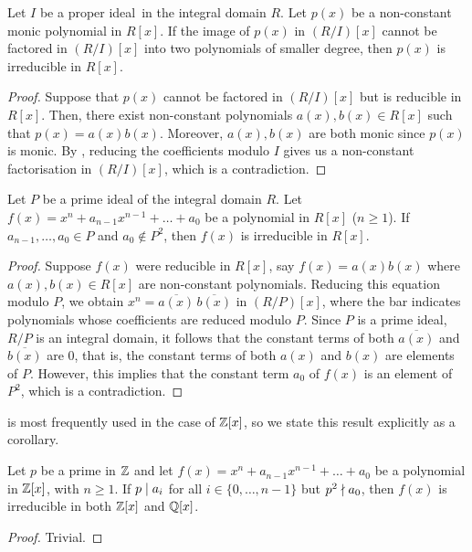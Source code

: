 \begin{prop}
    Let $I$ be a proper ideal\footnotemark\ in the integral domain $R$. Let $p(x)$ be a non-constant monic polynomial in $R[x]$. If the image of $p(x)$ in $(R/I)[x]$ cannot be factored in $(R/I)[x]$ into two polynomials of smaller degree, then $p(x)$ is irreducible in $R[x]$.
\end{prop}
\begin{proof}
    Suppose that $p(x)$ cannot be factored in $(R/I)[x]$ but is reducible in $R[x]$. Then, there exist non-constant polynomials $a(x), b(x) \in R[x]$ such that $p(x) = a(x) b(x)$. Moreover, $a(x), b(x)$ are both monic since $p(x)$ is monic. By , reducing the coefficients modulo $I$ gives us a non-constant factorisation in $(R/I)[x]$, which is a contradiction.
\end{proof}

\begin{prop} \label{prop:ES-criterion}
    Let $P$ be a prime ideal of the integral domain $R$. Let $f(x) = x^n + a_{n-1} x^{n-1} + \ldots + a_0$ be a polynomial in $R[x]$ ($n \geq 1$). If $a_{n-1}, \ldots, a_0 \in P$ and $a_0 \notin P^2$, then $f(x)$ is irreducible in $R[x]$.
\end{prop}
\begin{proof}
    Suppose $f(x)$ were reducible in $R[x]$, say $f(x) = a(x) b(x)$ where $a(x), b(x) \in R[x]$ are non-constant polynomials. Reducing this equation modulo $P$, we obtain $x^n = \overline{a(x)} \, \overline{b(x)}$ in $(R/P)[x]$, where the bar indicates polynomials whose coefficients are reduced modulo $P$. Since $P$ is a prime ideal, $R/P$ is an integral domain, it follows that the constant terms of both $\overline{a(x)}$ and $\overline{b(x)}$ are $0$, that is, the constant terms of both $a(x)$ and $b(x)$ are elements of $P$. However, this implies that the constant term $a_0$ of $f(x)$ is an element of $P^2$, which is a contradiction.
\end{proof}

 is most frequently used in the case of $\mathbb{Z}[x]$, so we state this result explicitly as a corollary. 

\begin{cor} \label{cor:ES-criterion-for-Z}
    Let $p$ be a prime in $\mathbb{Z}$ and let $f(x) = x^n + a_{n-1}x^{n-1} + \ldots + a_0$ be a polynomial in $\mathbb{Z}[x]$, with $n \geq 1$. If $p \mid a_i$ for all $i \in \{0, \ldots, n-1\}$ but $p^2 \nmid a_0$, then $f(x)$ is irreducible in both $\mathbb{Z}[x]$ and $\mathbb{Q}[x]$.
\end{cor}
\begin{proof}
    Trivial.
\end{proof}